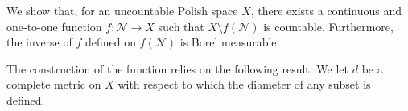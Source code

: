 \documentclass[12pt]{article}
\begin{document}

We show that, for an uncountable Polish space $X$, there exists a continuous and one-to-one function $f\colon\mathcal{N}\rightarrow X$ such that $X\setminus f(\mathcal{N})$ is countable. Furthermore, the inverse of $f$ defined on $f(\mathcal{N})$ is Borel measurable.

The construction of the function relies on the following result. We let $d$ be a complete metric on $X$ with respect to which the diameter of any subset is defined.
\end{document}
